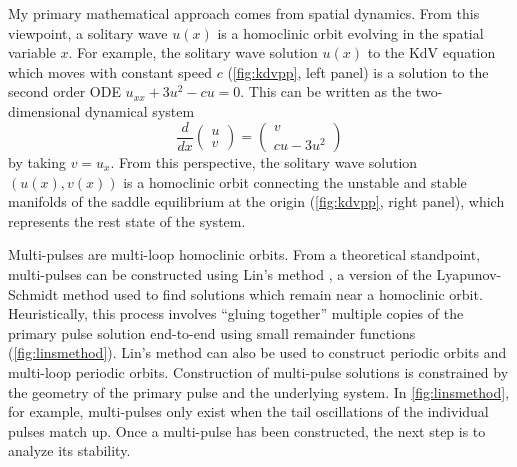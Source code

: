 \documentclass[12pt,reqno,oneside,hidelinks]{article}
\begin{document}
My primary mathematical approach comes from spatial dynamics. From this viewpoint, a solitary wave $u(x)$ is a homoclinic orbit evolving in the spatial variable $x$. For example, the solitary wave solution $u(x)$ to the KdV equation which moves with constant speed $c$ (\cref{fig:kdvpp}, left panel) is a solution to the second order ODE $u_{xx} + 3 u^2 - c u = 0$. This can be written as the two-dimensional dynamical system 
\[
\frac{d}{dx}\begin{pmatrix}u\\v\end{pmatrix}
= \begin{pmatrix}v \\ cu - 3u^2\end{pmatrix}
\]
by taking $v = u_x$. From this perspective, the solitary wave solution $(u(x), v(x))$ is a homoclinic orbit connecting the unstable and stable manifolds of the saddle equilibrium at the origin (\cref{fig:kdvpp}, right panel), which represents the rest state of the system. 

Multi-pulses are multi-loop homoclinic orbits. From a theoretical standpoint, multi-pulses can be constructed using Lin's method \cite{Lin2008}, a version of the Lyapunov-Schmidt method used to find solutions which remain near a homoclinic orbit. Heuristically, this process involves ``gluing together'' multiple copies of the primary pulse solution end-to-end using small remainder functions (\cref{fig:linsmethod}). Lin's method can also be used to construct periodic orbits and multi-loop periodic orbits. Construction of multi-pulse solutions is constrained by the geometry of the primary pulse and the underlying system. In \cref{fig:linsmethod}, for example, multi-pulses only exist when the tail oscillations of the individual pulses match up. Once a multi-pulse has been constructed, the next step is to analyze its stability.
\end{document}
